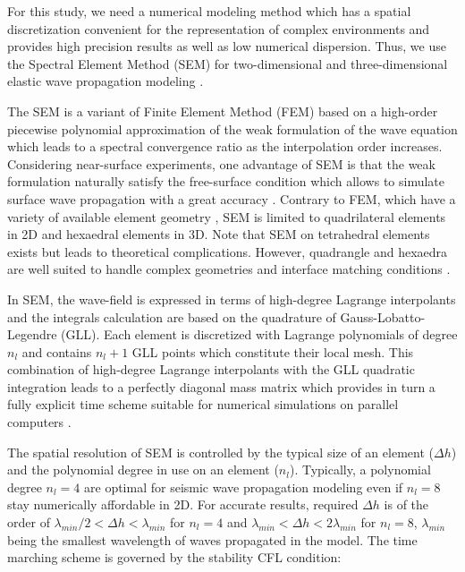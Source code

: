 \documentclass[manuscript,revised]{geophysics}
\begin{document}
\noindent For this study, we need a numerical modeling method which has a spatial discretization convenient for the representation of complex environments and provides high precision results as well as low numerical dispersion. Thus, we use the Spectral Element Method (SEM) for two-dimensional and three-dimensional elastic wave propagation modeling \citep{Komatitsch_SEM_1998,Komatitsch_ISM_1999,Komatitsch_SEM_2005,Festa_PML_2005}. 

\noindent The SEM is a variant of Finite Element Method (FEM) \citep{Lysmer_FEM_1972,Seron_FEM_1990,Hulbert_FEM_1990,Tromp_SEM_2008} based on a high-order piecewise polynomial approximation of the weak formulation of the wave equation which leads to a spectral convergence ratio as the interpolation order increases. Considering near-surface experiments, one advantage of SEM is that the weak formulation naturally satisfy the free-surface condition which allows to simulate surface wave propagation with a great accuracy \citep{komatitsch1998spectral,komatitsch1999spectral,Komatitsch_SEM_2005}. Contrary to FEM, which have a variety of available element geometry \citep{dhatt1984finite}, SEM is limited to quadrilateral elements in 2D and hexaedral elements in 3D. Note that SEM on tetrahedral elements exists \citep{komatitsch2001wave} but leads to theoretical complications. However, quadrangle and hexaedra are well suited to handle complex geometries and interface matching conditions \citep{Cristini_SEM_2012}. 

\noindent In SEM, the wave-field is expressed in terms of high-degree Lagrange interpolants and the integrals calculation are based on the quadrature of Gauss-Lobatto-Legendre (GLL). Each element is discretized with Lagrange polynomials of degree $n_{l}$ and contains $n_{l}+1$ GLL points which constitute their local mesh. This combination of high-degree Lagrange interpolants with the GLL quadratic integration leads to a perfectly diagonal mass matrix which provides in turn a fully explicit time scheme suitable for numerical simulations on parallel computers \citep{komatitsch1998spectral,komatitsch1999spectral}.

\noindent The spatial resolution of SEM is controlled by the typical size of an element ($\Delta h$) and the polynomial degree in use on an element ($n_{l}$). Typically, a polynomial degree $n_{l}=4$ are optimal for seismic wave propagation modeling \citep{moczo2011finite} even if $n_{l}=8$ stay numerically affordable in 2D. For accurate results, required $\Delta h$ is of the order of $\lambda_{min} /2 < \Delta h < \lambda_{min}$ for $n_{l}=4$ and $\lambda_{min} < \Delta h < 2\lambda_{min}$ for $n_{l}=8$, $\lambda_{min}$ being the smallest wavelength of waves propagated in the model. The time marching scheme is governed by the stability CFL condition:
\end{document}
